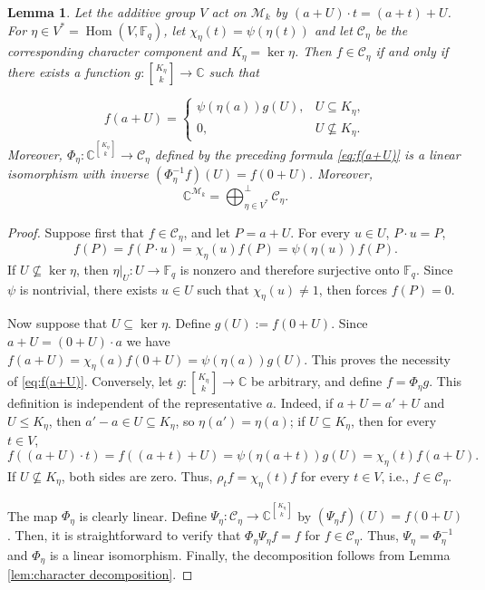 \documentclass[11pt]{article}
\newtheorem{lemma}{Lemma}
\theoremstyle{definition}
\newcommand{\Fq}{\mathbb F_q}
\newcommand{\Gr}[2]{\genfrac{[}{]}{0pt}{}{#1}{#2}}
\newcommand{\Hom}{\operatorname{Hom}}
\begin{document}
\begin{lemma}\label{lem:affine-character-components}
Let the additive group $V$ act on $\mathcal M_k$ by $(a+U)\cdot t=(a+t)+U$. For $\eta\in V^*=\Hom(V,\Fq)$, let $\chi_\eta(t)=\psi(\eta(t))$ and let $\mathcal C_\eta$ be the corresponding character component and $K_\eta=\ker\eta$. Then $f\in\mathcal C_\eta$ if and only if there exists a function $g:\Gr{K_\eta}{k}\to\mathbb C$ such that

\begin{equation}\label{eq:f(a+U)}
    f(a+U)=
\begin{cases}
\psi(\eta(a))g(U),&U\subseteq K_\eta,\\
0,&U\nsubseteq K_\eta.
\end{cases}
\end{equation}
Moreover, $\Phi_\eta: \mathbb C^{\Gr{K_\eta}{k}}\to\mathcal C_\eta$
defined by the preceding formula \eqref{eq:f(a+U)} is a linear isomorphism with inverse $(\Phi^{-1}_\eta f)(U)=f(0+U)$. Moreover,
\[
\mathbb C^{\mathcal M_k}
=
\bigoplus_{\eta\in V^*}^{\perp}\mathcal C_\eta.
\]    
\end{lemma}
\begin{proof}
Suppose first that $f \in \mathcal{C}_\eta$, and let $P = a + U$. For every $u\in U$, $P \cdot u = P$,
\[f(P) = f(P \cdot u) = \chi_\eta(u) f(P)=\psi(\eta(u))f(P).\] If $U\nsubseteq \ker \eta$, then $\eta|_U: U\to \Fq$ is nonzero and therefore surjective onto $\Fq$. Since $\psi$ is nontrivial, there exists $u\in U$ such that $\chi_\eta(u) \neq 1$, then forces $f(P)=0$.

Now suppose that $U\subseteq\ker\eta$. Define $g(U):=f(0+U)$. Since $a+U=(0+U)\cdot a$ we have $f(a + U) = \chi_\eta(a)f(0 + U) = \psi(\eta(a))g(U)$. This proves the necessity of \eqref{eq:f(a+U)}. Conversely, let $g: \Gr{K_\eta}{k}\to \mathbb{C}$ be arbitrary, and define $f=\Phi_\eta g$. This definition is independent of the representative $a$. Indeed, if $a + U = a' + U$ and $U \leq K_{\eta}$, then $a' - a \in U \subseteq K_{\eta}$, so $\eta(a') = \eta(a)$; if $U \subseteq K_{\eta}$, then for every $t \in V$, 
\[ f((a + U) \cdot t) = f((a + t) + U) = \psi(\eta(a + t))g(U)= \chi_{\eta}(t)f(a + U).\]
If $U \nsubseteq K_{\eta}$, both sides are zero. Thus, $\rho_t f = \chi_{\eta}(t)f$ for every $t \in V$, i.e., $f \in \mathcal C_{\eta}$. 

The map $\Phi_\eta$ is clearly linear. Define $\Psi_\eta : \mathcal C_\eta \to \mathbb C^{\Gr{K_\eta}{k}}$ by $(\Psi_\eta f)(U)= f(0 + U)$. Then, it is straightforward to verify that $\Phi_\eta \Psi_\eta f = f$ for $f \in \mathcal C_\eta$. Thus, $\Psi_\eta = \Phi_\eta^{-1}$ and $\Phi_\eta$ is a linear isomorphism. Finally, the decomposition follows from Lemma \ref{lem:character decomposition}. 
\end{proof}
\end{document}
